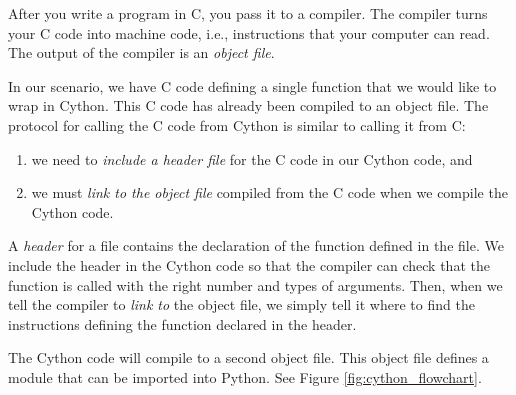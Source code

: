 After you write a program in C, you pass it to a compiler.
The compiler turns your C code into machine code, i.e., instructions that your computer can read.
The output of the compiler is an \emph{object file}.

In our scenario, we have C code defining a single function that we would like to wrap in Cython.
This C code has already been compiled to an object file.
The protocol for calling the C code from Cython is similar to calling it from C:
\begin{enumerate}
\item we need to \emph{include a header file} for the C code in our Cython code, and
\item we must \emph{link to the object file} compiled from the C code when we compile the Cython code.
\end{enumerate}

A \emph{header} for a file contains the declaration of the function defined in the file.
We include the header in the Cython code so that the compiler can check that the function is called with the right number and types of arguments.
Then, when we tell the compiler to \emph{link to} the object file, we simply tell it where to find the instructions defining the function declared in the header.

The Cython code will compile to a second object file.
This object file defines a module that can be imported into Python. See Figure \ref{fig:cython_flowchart}.

